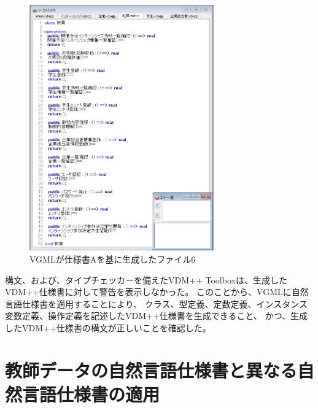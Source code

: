 \begin{figure}[tp]
    \begin{center}
    \includegraphics[width=300]{image/indication_vdm6.PNG}
    \caption{VGMLが仕様書Aを基に生成したファイル6}
    \label{fig:indication_vdm6}
    \end{center}
\end{figure}

構文、および、タイプチェッカーを備えたVDM++ Toolboxは、生成したVDM++仕様書に対して警告を表示しなかった。
このことから、VGMLに自然言語仕様書を適用することにより、
クラス、型定義、定数定義、インスタンス変数定義、操作定義を記述したVDM++仕様書を生成できること、
かつ、生成したVDM++仕様書の構文が正しいことを確認した。

\section{教師データの自然言語仕様書と異なる自然言語仕様書の適用}
\label{sec:different_generate_vdm}

